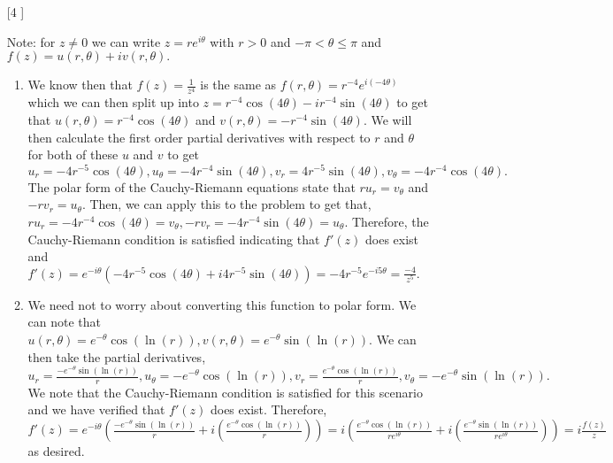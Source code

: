 \documentclass{article}
\theoremstyle{definition}
\begin{document}
\begin{enumerate}
\begin{enumerate}
    \end{enumerate}
    
    \item [[\phantom{-}4]]
    
    Note: for $z \neq 0$ we can write $z = re^{i\theta}$ with $r > 0$ and $-\pi < \theta \leq \pi$ and $f(z) = u(r, \theta) + iv(r, \theta).$
    
    \begin{enumerate}
    
        \item 
            
        We know then that $f(z) = \frac{1}{z^4}$ is the same as $f(r, \theta) = r^{-4}e^{i(-4\theta)}$ which we can then split up into $z = r^{-4}\cos(4\theta) - ir^{-4}\sin(4\theta)$ to get that $u(r, \theta) = r^{-4}\cos(4\theta)$ and $v(r, \theta) = -r^{-4}\sin(4\theta)$. We will then calculate the first order partial derivatives with respect to $r$ and $\theta$ for both of these $u$ and $v$ to get $u_r = -4r^{-5}\cos(4\theta), u_\theta = -4r^{-4}\sin(4\theta), v_r = 4r^{-5}\sin(4\theta), v_\theta = -4r^{-4}\cos(4\theta).$ The polar form of the Cauchy-Riemann equations state that $ru_r = v_\theta$ and $-rv_r = u_\theta$. Then, we can apply this to the problem to get that, $ru_r = -4r^{-4}\cos(4\theta) = v_\theta, -rv_r = -4r^{-4}\sin(4\theta) = u_\theta$. Therefore, the Cauchy-Riemann condition is satisfied indicating that $f'(z)$ does exist and $f'(z) = e^{-i\theta}(-4r^{-5}\cos(4\theta) + i4r^{-5}\sin(4\theta)) = -4r^{-5}e^{-i5\theta} = \frac{-4}{z^5}.$
        
        \item
        
        We need not to worry about converting this function to polar form. We can note that $u(r, \theta) = e^{-\theta}\cos(\ln(r)), v(r, \theta) = e^{-\theta}\sin(\ln(r))$. We can then take the partial derivatives, $u_r = \frac{-e^{-\theta}\sin(\ln(r))}{r}, u_\theta = -e^{-\theta}\cos(\ln(r)), v_r = \frac{e^{-\theta}\cos(\ln(r))}{r}, v_\theta = -e^{-\theta}\sin(\ln(r)).$ We note that the Cauchy-Riemann condition is satisfied for this scenario and we have verified that $f'(z)$ does exist. Therefore, $f'(z) = e^{-i\theta}(\frac{-e^{-\theta}\sin(\ln(r))}{r} + i(\frac{e^{-\theta}\cos(\ln(r))}{r})) = i(\frac{e^{-\theta}\cos(\ln(r))}{re^{i\theta}} + i(\frac{e^{-\theta}\sin(\ln(r))}{re^{i\theta}})) = i\frac{f(z)}{z}$ as desired.
        
    \end{enumerate}
    

\end{enumerate}
\end{document}

